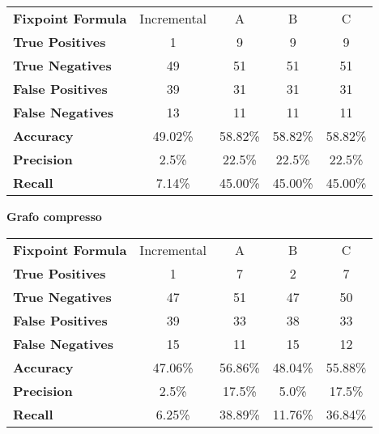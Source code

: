 \documentclass{article}
\begin{document}
\begin{center}
\begin{tabular}{| l | c | c | c | c |}
	\hline
	\textbf{Fixpoint Formula} & Incremental & A & B & C\\
	\hhline{|=|=|=|=|=|}
	\textbf{True Positives} & 1 & 9 & 9 & 9\\
	\hline
	\textbf{True Negatives} & 49 & 51 & 51 & 51\\
	\hline
	\textbf{False Positives} & 39 & 31 & 31 & 31\\
	\hline
	\textbf{False Negatives} & 13 & 11 & 11 & 11\\
	\hline
	\textbf{Accuracy} & 49.02\% & 58.82\% & 58.82\% & 58.82\%\\
	\hline
	\textbf{Precision} & 2.5\% & 22.5\% & 22.5\% & 22.5\%\\
	\hline
	\textbf{Recall} & 7.14\% & 45.00\% & 45.00\% & 45.00\%\\
	\hline
\end{tabular}
\end{center}
\vspace{4mm}

\textbf{Grafo compresso}

\begin{center}
\begin{tabular}{| l | c | c | c | c |}
	\hline
	\textbf{Fixpoint Formula} & Incremental & A & B & C\\
	\hhline{|=|=|=|=|=|}
	\textbf{True Positives} & 1 & 7 & 2 & 7\\
	\hline
	\textbf{True Negatives} & 47 & 51 & 47 & 50\\
	\hline
	\textbf{False Positives} & 39 & 33 & 38 & 33\\
	\hline
	\textbf{False Negatives} & 15 & 11 & 15 & 12\\
	\hline
	\textbf{Accuracy} & 47.06\% & 56.86\% & 48.04\% & 55.88\%\\
	\hline
	\textbf{Precision} & 2.5\% & 17.5\% & 5.0\% & 17.5\%\\
	\hline
	\textbf{Recall} & 6.25\% & 38.89\% & 11.76\% & 36.84\%\\
	\hline
\end{tabular}
\end{center}
\vspace{2mm}

\begin{center}
\end{center}
\end{document}
